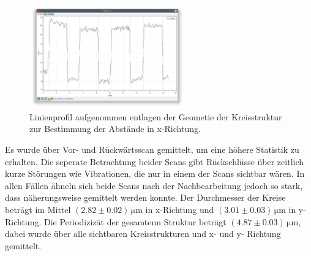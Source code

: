 \begin{figure}[H]
    \centering
    \includegraphics[width=0.6\textwidth]{bilder/Mikrostruktur/LineProfile.png}
    \caption{Linienprofil aufgenommen entlagen der Geometie der Kreisstruktur zur Bestimmung der Abstände in x-Richtung.}
    \label{fig:KREISE3}
\end{figure}
Es wurde über Vor- und Rückwärtsscan gemittelt, um eine höhere Statistik zu erhalten.
Die seperate Betrachtung beider Scans gibt Rückschlüsse über zeitlich kurze Störungen wie Vibrationen, die nur in einem der Scans sichtbar wären.
In allen Fällen ähneln sich beide Scans nach der Nachbearbeitung jedoch so stark, dass näherungsweise gemittelt werden konnte.
Der Durchmesser der Kreise beträgt im Mittel $(2.82\pm 0.02)\,\si{\micro\meter}$ in x-Richtung und $(3.01\pm 0.03)\,\si{\micro\meter}$ in y-Richtung. 
Die Periodizizät der gesamtenn Struktur beträgt $(4.87\pm 0.03)\,\si{\micro\meter}$,
dabei wurde über alle sichtbaren Kreisstrukturen und x- und y- Richtung gemittelt.

